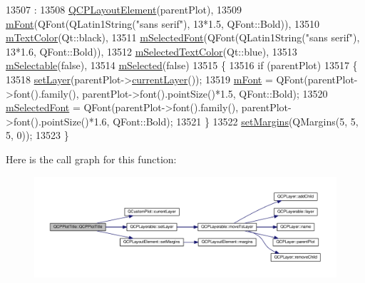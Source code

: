 \begin{DoxyCode}
13507                                                   :
13508   \hyperlink{class_q_c_p_layout_element_a8947f0ada17e672aaba3d424cbbb67e3}{QCPLayoutElement}(parentPlot),
13509   \hyperlink{class_q_c_p_plot_title_ad9e2c2a2e941f3444cb692a51df0df62}{mFont}(QFont(QLatin1String(\textcolor{stringliteral}{"sans serif"}), 13*1.5, QFont::Bold)),
13510   \hyperlink{class_q_c_p_plot_title_a5d7f834d6522c1a72fb0682c0b7ebe13}{mTextColor}(Qt::black),
13511   \hyperlink{class_q_c_p_plot_title_a95003186c39bbab902873a8ef4cbb547}{mSelectedFont}(QFont(QLatin1String(\textcolor{stringliteral}{"sans serif"}), 13*1.6, QFont::Bold)),
13512   \hyperlink{class_q_c_p_plot_title_a8b9760e62af92814c4effdd7ad69c5f9}{mSelectedTextColor}(Qt::blue),
13513   \hyperlink{class_q_c_p_plot_title_aadefb5e2b19b1cc7deda0a55ec747884}{mSelectable}(\textcolor{keyword}{false}),
13514   \hyperlink{class_q_c_p_plot_title_afef1342a20f5ca985a20b9cfdc03d815}{mSelected}(\textcolor{keyword}{false})
13515 \{
13516   \textcolor{keywordflow}{if} (parentPlot)
13517   \{
13518     \hyperlink{class_q_c_p_layerable_ab0d0da6d2de45a118886d2c8e16d5a54}{setLayer}(parentPlot->\hyperlink{class_q_custom_plot_af73057345656cbd1463454982d808b00}{currentLayer}());
13519     \hyperlink{class_q_c_p_plot_title_ad9e2c2a2e941f3444cb692a51df0df62}{mFont} = QFont(parentPlot->font().family(), parentPlot->font().pointSize()*1.5, QFont::Bold);
13520     \hyperlink{class_q_c_p_plot_title_a95003186c39bbab902873a8ef4cbb547}{mSelectedFont} = QFont(parentPlot->font().family(), parentPlot->font().pointSize()*1.6, 
      QFont::Bold);
13521   \}
13522   \hyperlink{class_q_c_p_layout_element_a8f450b1f3f992ad576fce2c63d8b79cf}{setMargins}(QMargins(5, 5, 5, 0));
13523 \}
\end{DoxyCode}


Here is the call graph for this function\+:\nopagebreak
\begin{figure}[H]
\begin{center}
\leavevmode
\includegraphics[width=350pt]{class_q_c_p_plot_title_aaae17bee2de6d6a1e695f76fb1abed03_cgraph}
\end{center}
\end{figure}


